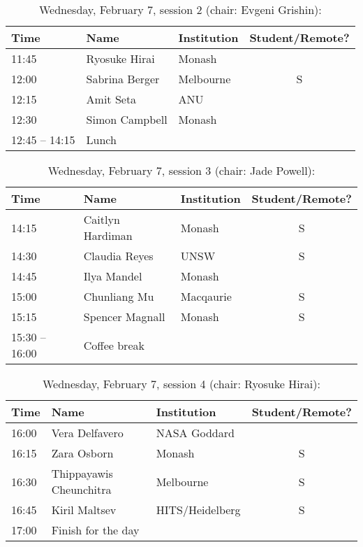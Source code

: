 \documentclass[amsmath,onecolumn]{revtex4-1}
\begin{document}
\begin{table}[!htbp]
	\centering
	\caption{Wednesday, February 7, session 2 (chair: Evgeni Grishin):}
\begin{tabular}{| l | l | l | c |}
	\hline
	Time & Name  & Institution & Student/Remote? \\ 		
	\hline
	11:45 & Ryosuke	Hirai & Monash & \\
	12:00 & Sabrina	Berger & Melbourne & S \\
	12:15 & Amit Seta & ANU & \\
	12:30 & Simon	Campbell & Monash & \\
	\hline
	12:45 -- 14:15 & Lunch & &  \\
	\hline
\end{tabular}
\end{table}

\begin{table}[!htbp]
	\centering
	\caption{Wednesday, February 7, session 3 (chair: Jade Powell):}
\begin{tabular}{| l | l | l | c |}
	\hline
	Time & Name  & Institution & Student/Remote? \\ 		
	\hline
	14:15& Caitlyn	Hardiman & Monash & S \\
	14:30 & Claudia Reyes & UNSW & S \\
	14:45 &  Ilya	Mandel & Monash & \\	
	15:00 & Chunliang	Mu & Macqaurie & S \\
	15:15 & Spencer	Magnall & Monash & S\\	
	\hline
	15:30 -- 16:00 & Coffee break & & \\
	\hline
\end{tabular}
\end{table}
	
\begin{table}[!htbp]
	\centering
	\caption{Wednesday, February 7, session 4 (chair: Ryosuke Hirai):}
\begin{tabular}{| l | l | l | c |}
	\hline
	Time & Name  & Institution & Student/Remote? \\ 		
	\hline
	16:00 & Vera	Delfavero & NASA Goddard & \\
	16:15 & Zara	Osborn & Monash & S \\
	16:30 & Thippayawis 	Cheunchitra & Melbourne & S\\
	16:45 & Kiril	Maltsev & HITS/Heidelberg & S\\
	\hline
	17:00 & Finish for the day & & \\
	\hline
\end{tabular}
\end{table}
\end{document}

